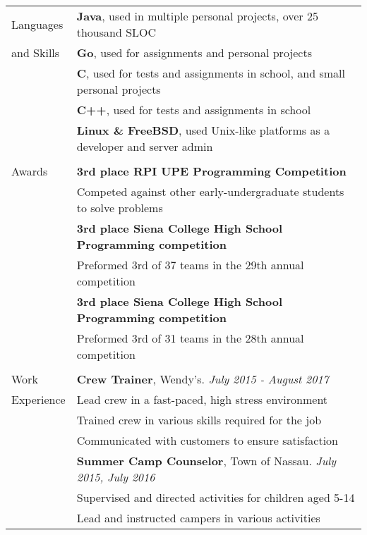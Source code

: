 \documentclass[letterpaper,10pt,oneside]{article}
\begin{document}
\begin{tabular}{@{} l l}
  \Large{Languages}
  & \textbf{Java}, used in  multiple personal projects, over 25 thousand SLOC \\
  \Large{and Skills}
  & \textbf{Go}, used for assignments and personal projects \\
  & \textbf{C}, used for tests and assignments in school, and small personal projects \\
  & \textbf{C++}, used for tests and assignments in school \\
  & \textbf{Linux \& FreeBSD}, used Unix-like platforms as a developer and server admin \\
  & \\

  \Large{Awards}
  & \textbf{3rd place RPI UPE Programming Competition} \\
  & Competed against other early-undergraduate students to solve problems \\
  & \textbf{3rd place Siena College High School Programming competition} \\
  & Preformed 3rd of 37 teams in the 29th annual competition \\
  & \textbf{3rd place Siena College High School Programming competition} \\
  & Preformed 3rd of 31 teams in the 28th annual competition \\
  & \\

  \Large{Work}
  & \textbf{Crew Trainer}, Wendy's. \textit{July 2015 - August 2017} \\
  \Large{Experience}
  & Lead crew in a fast-paced, high stress environment \\
  & Trained crew in various skills required for the job \\
  & Communicated with customers to ensure satisfaction \\
  & \textbf{Summer Camp Counselor}, Town of Nassau. \textit{July 2015, July 2016} \\
  & Supervised and directed activities for children aged 5-14 \\
  & Lead and instructed campers in various activities \\


\end{tabular}
\end{document}
